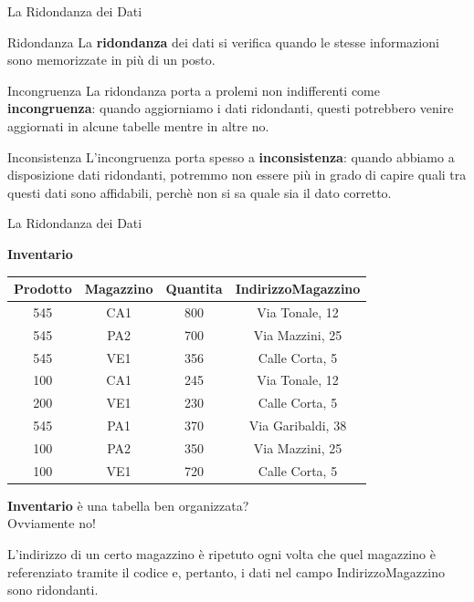 \begin{frame}{La Ridondanza dei Dati}
\begin{minipage}{0.9\textwidth}
    \begin{block}{Ridondanza}
        La \textbf{ridondanza} dei dati si verifica quando le stesse informazioni sono memorizzate in pi\`u di un posto.
    \end{block}
\end{minipage}
\pause
    \begin{block}{Incongruenza}
        La ridondanza porta a prolemi non indifferenti come \textbf{incongruenza}: quando aggiorniamo i dati ridondanti, questi potrebbero venire aggiornati in alcune tabelle mentre in altre no.
    \end{block}
\pause
    \begin{block}{Inconsistenza}
        L'incongruenza porta spesso a \textbf{inconsistenza}: quando abbiamo a disposizione dati ridondanti, potremmo non essere pi\`u in grado di capire quali tra questi dati sono affidabili, perch\`e non si sa quale sia il dato corretto.
    \end{block}
\end{frame}
%
\begin{frame}{La Ridondanza dei Dati}
\begin{minipage}[t]{0.55\linewidth}
    \begin{center}
        \textbf{Inventario}
        
        \begin{tabular}{|c|c|c|c|}
            \hline
            \rowcolor{cyan!30}Prodotto & Magazzino & Quantita & IndirizzoMagazzino \\
            \hline
            545 & CA1 & 800 & Via Tonale, 12 \\ \hline
            545 & PA2 & 700 & Via Mazzini, 25 \\ \hline
            545 & VE1 & 356 & Calle Corta, 5 \\ \hline
            100 & CA1 & 245 & Via Tonale, 12 \\ \hline
            200 & VE1 & 230 & Calle Corta, 5 \\ \hline
            545 & PA1 & 370 & Via Garibaldi, 38 \\ \hline
            100 & PA2 & 350 & Via Mazzini, 25 \\ \hline
            100 & VE1 & 720 & Calle Corta, 5 \\ \hline
        \end{tabular}
    \end{center}
\end{minipage}%
\hfill%
\begin{minipage}[t]{0.35\linewidth}
    \textbf{Inventario} \`e una tabella ben organizzata?
    \pause
    \newline
    \\Ovviamente no!
    
    L'indirizzo di un certo magazzino \`e ripetuto ogni volta che quel magazzino \`e referenziato tramite il codice e, pertanto, i dati nel campo IndirizzoMagazzino sono ridondanti.
\end{minipage}
    
\end{frame}
